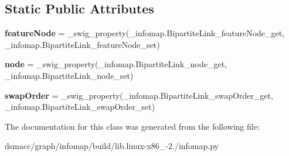 \subsection*{Static Public Attributes}
\begin{DoxyCompactItemize}
\item 
\mbox{\label{classinfomap_1_1BipartiteLink_a82c9d287c228ac10a77aadffc78bffad}} 
{\bfseries feature\+Node} = \+\_\+swig\+\_\+property(\+\_\+infomap.\+Bipartite\+Link\+\_\+feature\+Node\+\_\+get, \+\_\+infomap.\+Bipartite\+Link\+\_\+feature\+Node\+\_\+set)
\item 
\mbox{\label{classinfomap_1_1BipartiteLink_ac123f52de433a410ce989b177e880a7b}} 
{\bfseries node} = \+\_\+swig\+\_\+property(\+\_\+infomap.\+Bipartite\+Link\+\_\+node\+\_\+get, \+\_\+infomap.\+Bipartite\+Link\+\_\+node\+\_\+set)
\item 
\mbox{\label{classinfomap_1_1BipartiteLink_a3e1ca51c697e5ec987b151768cfea33f}} 
{\bfseries swap\+Order} = \+\_\+swig\+\_\+property(\+\_\+infomap.\+Bipartite\+Link\+\_\+swap\+Order\+\_\+get, \+\_\+infomap.\+Bipartite\+Link\+\_\+swap\+Order\+\_\+set)
\end{DoxyCompactItemize}


The documentation for this class was generated from the following file\+:\begin{DoxyCompactItemize}
\item 
dsmacc/graph/infomap/build/lib.\+linux-\/x86\+\_-\/2./infomap.\+py\end{DoxyCompactItemize}
